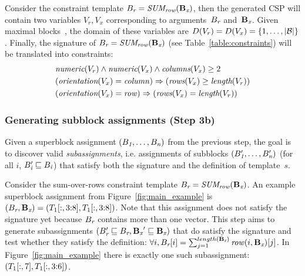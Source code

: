 \begin{example}

  Consider the constraint template $B_{\textit{r}} = \textit{SUM\textsubscript{row}}(\mathbf{B_{\textit{x}}})$, then the generated CSP will contain two variables $V_r, V_x$ corresponding to arguments~$B_{\textit{r}}$ and~$\mathbf{B_{\textit{x}}}$.
  Given maximal blocks~\blocks, the domain of these variables are $D(V_r) = D(V_x) = \{ 1, \dots, |\mathcal{B}| \}$.
  Finally, the signature of $B_{\textit{r}} = \textit{SUM\textsubscript{row}}(\mathbf{B_{\textit{x}}})$ (see Table~\ref{table:constraints}) will be translated into constraints:
  \begin{align*}
    & \textit{numeric}(V_r) \land \textit{numeric}(V_x) \land \textit{columns}(V_x) \geq 2 \\
    & (\textit{orientation}(V_x) = \mathit{column}) \Rightarrow (\textit{rows}(V_x) \geq \textit{length}(V_r)) \\
    & (\textit{orientation}(V_x) = \mathit{row}) \Rightarrow (\textit{rows}(V_x) = \textit{length}(V_r))
  \end{align*}
\end{example}





\subsubsection{Generating subblock assignments (Step 3b)}
\label{sec:algo:subgr}
Given a superblock assignment $(B_{\textit{1}}, \dots, B_{\textit{n}})$ from the previous step, the goal is to discover valid \textit{subassignments}, i.e. assignments of subblocks $(B'_{\textit{1}}, \dots, B'_{\textit{n}})$ (for all $i$, $B'_{\textit{i}} \sqsubseteq B_{\textit{i}}$) that satisfy both the signature and the definition of template~$s$.

\begin{example}
  Consider the sum-over-rows constraint template $B_{\textit{r}} = \textit{SUM\textsubscript{row}}(\mathbf{B_{\textit{x}}})$.
  An example superblock assignment from Figure~\ref{fig:main_example} is $(B_{\textit{r}}, \mathbf{B_{\textit{x}}}) = (T_1[:,3{:}8], T_1[:,3{:}8])$.
  Note that this assignment does not satisfy the signature yet because $B_{\textit{r}}$ contains more than one vector.
  This step aims to generate subassignments $(B_{\textit{r}}' \sqsubseteq B_{\textit{r}}, \mathbf{B_{\textit{x}}}' \sqsubseteq \mathbf{B_{\textit{x}}})$ that do satisfy the signature and test whether they satisfy the definition:
  $\forall i, B_{\textit{r}}[i] = \sum_{j = 1}^{length(\mathbf{B_{\textit{x}}})} \mathit{row}(i, \mathbf{B_{\textit{x}}})[j]$.
  In Figure~\ref{fig:main_example} there is exactly one such subassignment: $(T_1[:,7], T_1[:,3{:}6])$.
\end{example}

